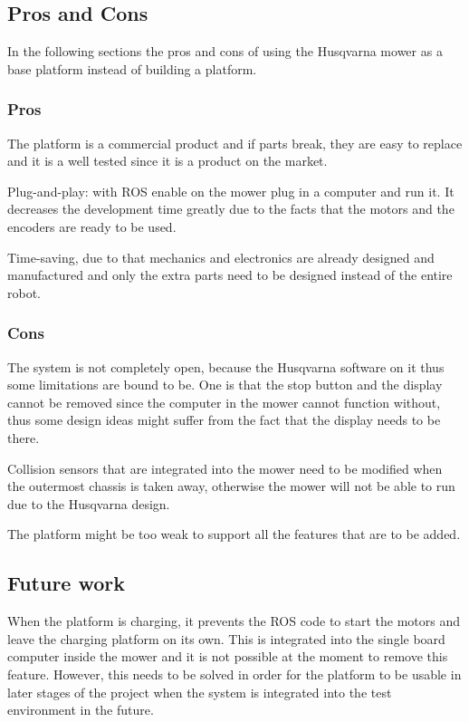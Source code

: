 \subsection{Pros and Cons}\label{lawnmowerProsandCons}
\noindent
In the following sections the pros and cons of using the Husqvarna mower as a base platform instead of building a platform.


\subsubsection{Pros}
\noindent
The platform is a commercial product and if parts break, they are easy to replace and it is a well tested since it is a product on the market.

Plug-and-play: with ROS enable on the mower plug in a computer and run it. It decreases the development time greatly due to the facts that the motors and the encoders are ready to be used. 

Time-saving, due to that mechanics and electronics are already designed and manufactured and only the extra parts need to be designed instead of the entire robot.



\subsubsection{Cons}
\noindent
The system is not completely open, because the Husqvarna software on it thus some limitations are bound to be. One is that the stop button and the display cannot be removed since the computer in the mower cannot function without, thus some design ideas might suffer from the fact that the display needs to be there.

Collision sensors that are integrated into the mower need to be modified when the outermost chassis is taken away, otherwise the mower will not be able to run due to the Husqvarna design.

The platform might be too weak to support all the features that are to be added.


\subsection{Future work}\label{lawnmowerFuture}
\noindent

When the platform is charging, it prevents the ROS code to start the motors and leave the charging platform on its own. This is integrated into the single board computer inside the mower and it is not possible at the moment to remove this feature. However, this needs to be solved in order for the platform to be usable in later stages of the project when the system is integrated into the test environment in the future.



